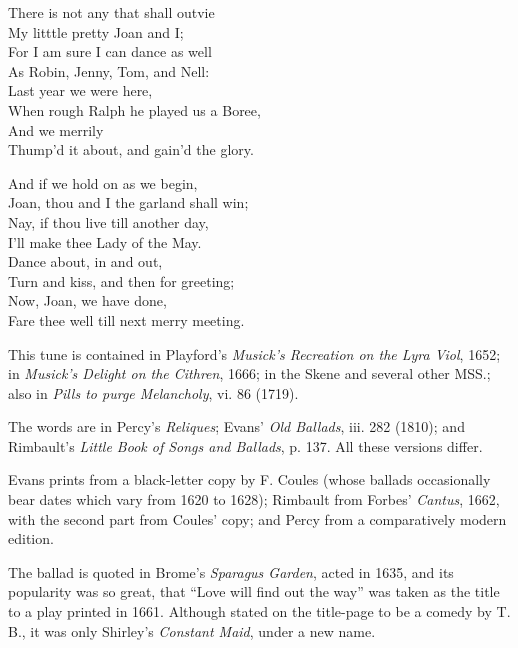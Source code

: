 \begin{dcverse}
\begin{patverse}
There is not any that shall outvie\\
My litttle pretty Joan and I;\\
For I am sure I can dance as well\\
As Robin, Jenny, Tom, and Nell:\\
Last year we were here,\\
When rough Ralph he played us a Boree,\\
And we merrily\\
Thump’d it about, and gain’d the glory.
\end{patverse}

\begin{patverse}
And if we hold on as we begin,\\
Joan, thou and I the garland shall win;\\
Nay, if thou live till another day,\\
I’ll make thee Lady of the May.\\
Dance about, in and out,\\
Turn and kiss, and then for greeting;\\
Now, Joan, we have done,\\
Fare thee well till next merry meeting.
\end{patverse}
\end{dcverse}


This tune is contained in Playford’s \textit{Musick’s Recreation on the Lyra Viol},
1652; in \textit{Musick’s Delight on the Cithren}, 1666; in the Skene and several other
MSS.; also in \textit{ Pills to purge Melancholy}, vi. 86 (1719).

The words are in Percy’s \textit{Reliques}; Evans’ \textit{Old Ballads}, iii. 282 (1810); and
Rimbault’s \textit{Little Book of Songs and Ballads}, p. 137. All these versions differ.

Evans prints from a black-letter copy by F. Coules (whose ballads occasionally
bear dates which vary from 1620 to 1628); Rimbault from Forbes’ \textit{Cantus}, 1662,
with the second part from Coules’ copy; and Percy from a comparatively modern
edition.

The ballad is quoted in Brome’s \textit{Sparagus Garden}, acted in 1635, and its
popularity was so great, that “Love will find out the way” was taken as the
title to a play printed in 1661. Although stated on the title-page to be a
comedy by T. B., it was only Shirley’s \textit{Constant Maid}, under a new name.
\pagebreak

